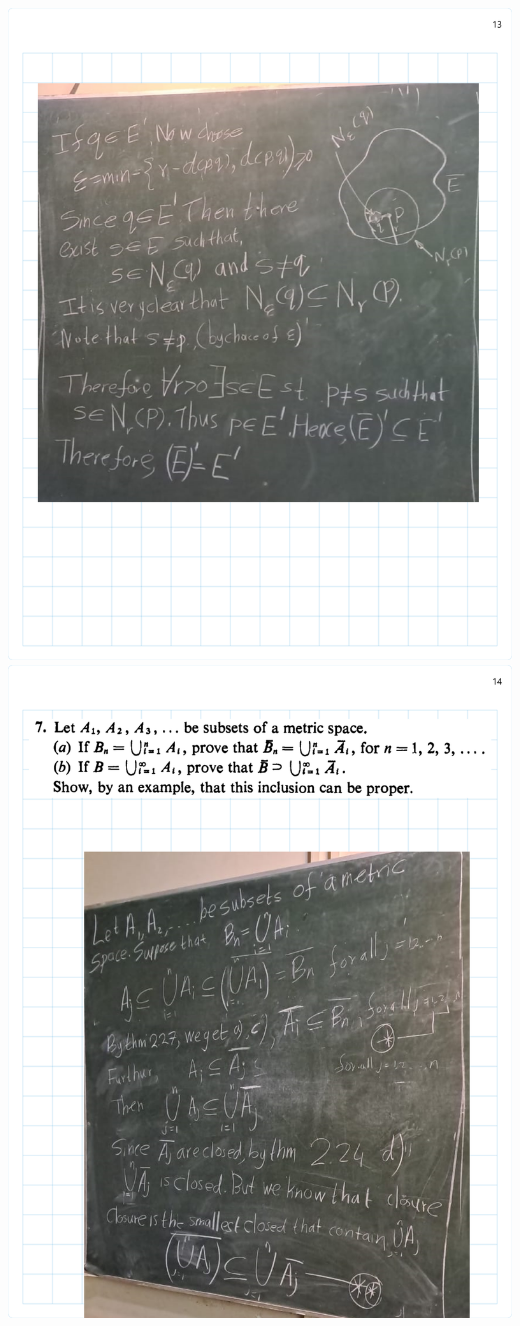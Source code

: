 \documentclass[
]{book}
\theoremstyle{definition}
\theoremstyle{definition}
\theoremstyle{definition}
\theoremstyle{definition}
\theoremstyle{remark}
\begin{document}
\includegraphics{Figures/Ex-2/Rudin Ch2-13.png}
\includegraphics{Figures/Ex-2/Rudin Ch2-14.png}
\end{document}
